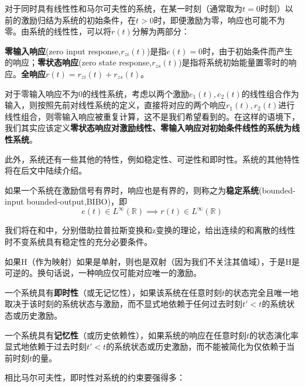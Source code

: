 对于同时具有线性性和马尔可夫性的系统，在某一时刻（通常取为$t=0$时刻）以前的激励归结为系统的初始条件，在$t>0$时，即便激励为零，响应也可能不为零。由系统的线性性，可以将$r(t)$分解为两部分：
\begin{definition}[零输入响应与零状态响应]
    \label{def:zir_zsr}
   \textbf{零输入响应}(zero input response,$r_{zi}(t)$)是指$e(t)=0$时，由于初始条件而产生的响应；\textbf{零状态响应}(zero state response,$r_{zs}(t)$)是指将系统初始能量置零时的响应。\textbf{全响应}$r(t)=r_{zi}(t)+r_{zs}(t)$。
\end{definition}
对于零输入响应不为0的线性系统，考虑以两个激励$e_1(t),e_2(t)$的线性组合作为输入，则按照先前对线性系统的定义，直接将对应的两个响应$r_1(t),r_2(t)$进行线性组合，则零输入响应被重复计算，这不是我们希望看到的。在这样的语境下，我们其实应该定义\textbf{零状态响应对激励线性、零输入响应对初始条件线性的系统为线性系统}。

此外，系统还有一些其他的特性，例如稳定性、可逆性和即时性。系统的其他特性将在后文中陆续介绍。

\begin{definition}[稳定性]
    \label{def:system_stability}
    如果一个系统在激励信号有界时，响应也是有界的，则称之为\textbf{稳定系统}(bounded-input bounded-output,BIBO)，即
    \[e(t)\in L^\infty(\mathbb{R})\implies r(t)\in L^\infty(\mathbb{R})\]
\end{definition}
我们将在和中，分别借助拉普拉斯变换和z变换的理论，给出连续的和离散的线性时不变系统具有稳定性的充分必要条件。

\begin{definition}[可逆性]
    \label{def:system_inversion}
    如果H（作为映射）如果是单射，则也是双射（因为我们不关注其值域），于是H是可逆的。换句话说，一种响应仅可能对应唯一的激励。
\end{definition}

\begin{definition}[即时性与记忆性]
    \label{def:system_memory}
一个系统具有\textbf{即时性}（或无记忆性），如果该系统在任意时刻$t$的状态完全且唯一地取决于该时刻的系统状态与激励，而不显式地依赖于任何过去时刻$t'<t$的系统状态或历史激励。

一个系统具有\textbf{记忆性}（或历史依赖性），如果系统的响应在任意时刻$t$的状态演化率显式地依赖于过去时刻$t'<t$的系统状态或历史激励，而不能被简化为仅依赖于当前时刻$t$的量。
\end{definition}

相比马尔可夫性，即时性对系统的约束要强得多：

